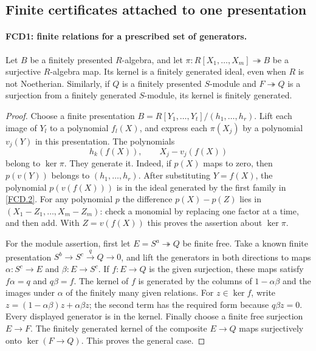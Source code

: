 \subsection{Finite certificates attached to one presentation}

\paragraph{FCD1: finite relations for a prescribed set of generators.}
\label{claim:FCD1}
Let $B$ be a finitely presented $R$-algebra, and let
$\pi:R[X_1,\ldots,X_m]\twoheadrightarrow B$ be a surjective
$R$-algebra map.  Its kernel is a finitely generated ideal, even when
$R$ is not Noetherian.  Similarly, if $Q$ is a finitely presented
$S$-module and $F\twoheadrightarrow Q$ is a surjection from a
finitely generated $S$-module, its kernel is finitely generated.

\begin{proof}
Choose a finite presentation
$B=R[Y_1,\ldots,Y_t]/(h_1,\ldots,h_r)$.
Lift each image of $Y_l$ to a polynomial $f_l(X)$, and express each
$\pi(X_j)$ by a polynomial $v_j(Y)$ in this presentation.  The
polynomials
\[
 h_k(f(X)),\qquad X_j-v_j(f(X))                         \tag{FCD.2}\label{FCD.2}
\]
belong to $\ker\pi$.  They generate it.  Indeed, if $p(X)$ maps to
zero, then $p(v(Y))$ belongs to $(h_1,\ldots,h_r)$.
After substituting $Y=f(X)$, the polynomial $p(v(f(X)))$ is in
the ideal generated by the first family in \eqref{FCD.2}.
For any polynomial $p$ the difference $p(X)-p(Z)$ lies in
$(X_1-Z_1,\ldots,X_m-Z_m)$: check a monomial by replacing one
factor at a time, and then add.  With $Z=v(f(X))$ this proves the
assertion about $\ker\pi$.

For the module assertion, first let $E=S^a\twoheadrightarrow Q$
be finite free.  Take a known finite presentation
$S^b\to S^c\xrightarrow{q}Q\to0$, and lift the generators in
both directions to maps $\alpha:S^c\to E$ and
$\beta:E\to S^c$.  If $f:E\to Q$ is the given surjection,
these maps satisfy $f\alpha=q$ and $q\beta=f$.
The kernel of $f$ is generated by the columns of $1-\alpha\beta$
and the images under $\alpha$ of the finitely many given relations.
For $z\in\ker f$, write
$z=(1-\alpha\beta)z+\alpha\beta z$; the second term has the
required form because $q\beta z=0$.  Every displayed generator is
in the kernel.  Finally choose a finite free surjection $E\to F$.
The finitely generated kernel of the composite $E\to Q$ maps
surjectively onto $\ker(F\to Q)$.  This proves the general case.
\end{proof}

